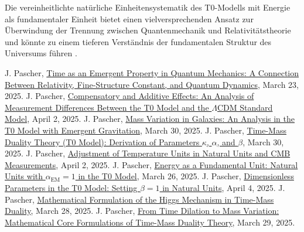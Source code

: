 \documentclass[12pt,a4paper]{article}
\newcommand{\alphaEM}{\alpha_{\text{EM}}}
\begin{document}
Die vereinheitlichte natürliche Einheitensystematik des T0-Modells mit Energie als fundamentaler Einheit bietet einen vielversprechenden Ansatz zur Überwindung der Trennung zwischen Quantenmechanik und Relativitätstheorie und könnte zu einem tieferen Verständnis der fundamentalen Struktur des Universums führen \cite{pascher_vereinheitlichung_2025}.


\begin{thebibliography}{99}
	 J. Pascher, \href{https://github.com/jpascher/T0-Time-Mass-Duality/tree/main/2/pdf/English/ZeitEmergentQMEn.pdf}{Time as an Emergent Property in Quantum Mechanics: A Connection Between Relativity, Fine-Structure Constant, and Quantum Dynamics}, March 23, 2025.
	 J. Pascher, \href{https://github.com/jpascher/T0-Time-Mass-Duality/tree/main/2/pdf/English/MessdifferenzenT0StandardEn.pdf}{Compensatory and Additive Effects: An Analysis of Measurement Differences Between the T0 Model and the $\Lambda$CDM Standard Model}, April 2, 2025.
	 J. Pascher, \href{https://github.com/jpascher/T0-Time-Mass-Duality/tree/main/2/pdf/English/MassVarGalaxienEn.pdf}{Mass Variation in Galaxies: An Analysis in the T0 Model with Emergent Gravitation}, March 30, 2025.
	 J. Pascher, \href{https://github.com/jpascher/T0-Time-Mass-Duality/tree/main/2/pdf/English/ZeitMasseT0ParamsEn.pdf}{Time-Mass Duality Theory (T0 Model): Derivation of Parameters $\kappa$, $\alpha$, and $\beta$}, March 30, 2025.
	 J. Pascher, \href{https://github.com/jpascher/T0-Time-Mass-Duality/tree/main/2/pdf/English/NatEinheitenAlpha1En.pdf}{Adjustment of Temperature Units in Natural Units and CMB Measurements}, April 2, 2025.
	 J. Pascher, \href{https://github.com/jpascher/T0-Time-Mass-Duality/tree/main/2/pdf/English/NatEinheitenAlpha1En.pdf}{Energy as a Fundamental Unit: Natural Units with $\alphaEM = 1$ in the T0 Model}, March 26, 2025.
	 J. Pascher, \href{https://github.com/jpascher/T0-Time-Mass-Duality/tree/main/2/pdf/English/Alpha1Beta1KonsistenzEn.pdf}{Dimensionless Parameters in the T0 Model: Setting $\beta = 1$ in Natural Units}, April 4, 2025.
	 J. Pascher, \href{https://github.com/jpascher/T0-Time-Mass-Duality/tree/main/2/pdf/English/MathHiggsZeitMasseEn.pdf}{Mathematical Formulation of the Higgs Mechanism in Time-Mass Duality}, March 28, 2025.
	 J. Pascher, \href{https://github.com/jpascher/T0-Time-Mass-Duality/tree/main/2/pdf/English/MathZeitMasseLagrangeEn.pdf}{From Time Dilation to Mass Variation: Mathematical Core Formulations of Time-Mass Duality Theory}, March 29, 2025.

\end{thebibliography}
\end{document}
